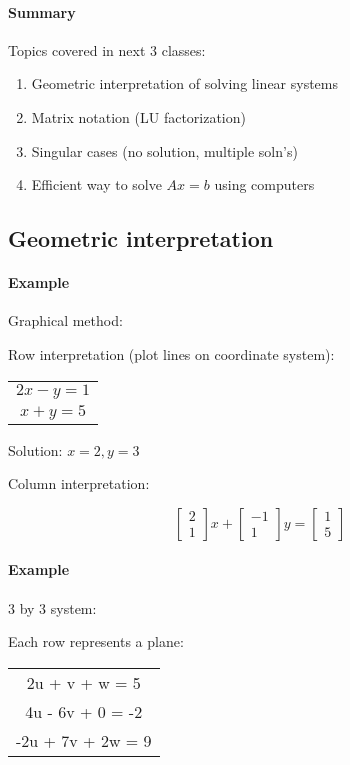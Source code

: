 \documentclass[12pt]{article}
\newcommand{\<}{\langle}
\renewcommand{\>}{\rangle}
\begin{document}
\paragraph{Summary}
Topics covered in next 3 classes:
\begin{enumerate}
	\item Geometric interpretation of solving linear systems
	\item Matrix notation (LU factorization)
	\item Singular cases (no solution, multiple soln's)
	\item Efficient way to solve $Ax=b$ using computers
\end{enumerate}

\subsection{Geometric interpretation}

\paragraph{Example} Graphical method:

Row interpretation (plot lines on coordinate system):

\begin{tabular}{c}
	$2x - y = 1$ \\
	$x + y = 5$
\end{tabular}
Solution: $x=2,y=3$

Column interpretation:

$$ \begin{bmatrix}
	2 \\ 1
\end{bmatrix} x + 
\begin{bmatrix}
	-1 \\ 1
\end{bmatrix} y =
\begin{bmatrix}
	1 \\ 5
\end{bmatrix}$$

\paragraph{Example} 3 by 3 system:

Each row represents a plane:

\begin{tabular}{c}
	2u + v + w = 5 \\
	4u - 6v + 0 = -2 \\
	-2u + 7v + 2w = 9
\end{tabular}
\end{document}

